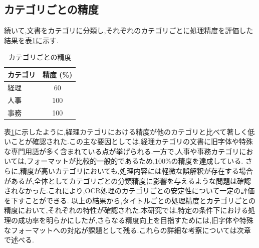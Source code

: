 \clearpage

\subsection{カテゴリごとの精度}
\label{subsec:category}

続いて,文書をカテゴリに分類し,それぞれのカテゴリごとに処理精度を評価した結果を表\ref{tab:category_accuracy}に示す.

\begin{table}[h]
  \centering
  \begin{tabular}{|l|c|}
    \hline
    \textbf{カテゴリ} & \textbf{精度 (\%)} \\ \hline
    経理 & 60 \\ \hline
    人事 & 100 \\ \hline
    事務 & 100 \\ \hline
  \end{tabular}
  \caption{カテゴリごとの精度}
  \label{tab:category_accuracy}
\end{table}

表\ref{tab:category_accuracy}に示したように,経理カテゴリにおける精度が他のカテゴリと比べて著しく低いことが確認された.この主な要因としては,経理カテゴリの文書に旧字体や特殊な専門用語が多く含まれている点が挙げられる.一方で,人事や事務カテゴリにおいては,フォーマットが比較的一般的であるため,100\%の精度を達成している.
さらに,精度が高いカテゴリにおいても,処理内容には軽微な誤解釈が存在する場合があるが,全体としてカテゴリごとの分類精度に影響を与えるような問題は確認されなかった.これにより,OCR処理のカテゴリごとの安定性について一定の評価を下すことができる.
以上の結果から,タイトルごとの処理精度とカテゴリごとの精度において,それぞれの特性が確認された.本研究では,特定の条件下における処理の成功率を明らかにしたが,さらなる精度向上を目指すためには,旧字体や特殊なフォーマットへの対応が課題として残る.これらの詳細な考察については次章で述べる.
